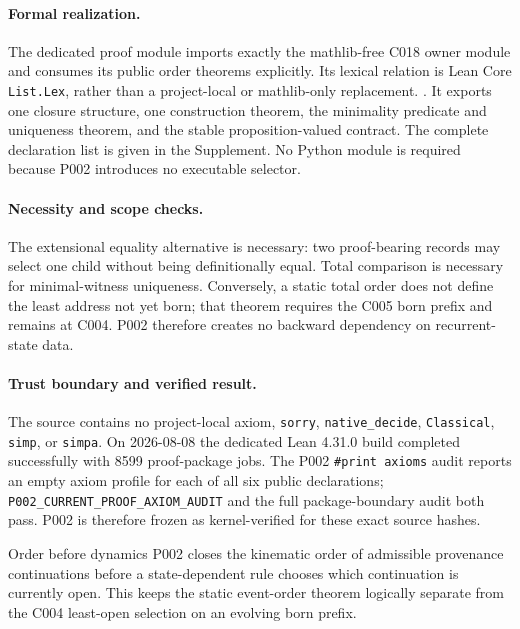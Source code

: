 \paragraph*{Formal realization.}
The dedicated proof module imports exactly the mathlib-free C018 owner module
and consumes its public order theorems explicitly.  Its lexical relation is
Lean Core \texttt{List.Lex}, rather than a project-local or mathlib-only replacement.
\cite[List.Lex and decidableLex in Init/Data/List/Basic.lean, Lean v4.31.0]{LeanListLex431}.
It exports one closure
structure, one construction theorem, the minimality predicate and uniqueness
theorem, and the stable proposition-valued contract.  The complete declaration
list is given in the Supplement.  No Python module is required because P002
introduces no executable selector.

\paragraph*{Necessity and scope checks.}
The extensional equality alternative is necessary: two proof-bearing records
may select one child without being definitionally equal.  Total comparison is
necessary for minimal-witness uniqueness.  Conversely, a static total order
does not define the least address not yet born; that theorem requires the C005
born prefix and remains at C004.  P002 therefore creates no backward dependency
on recurrent-state data.

\paragraph*{Trust boundary and verified result.}
The source contains no project-local axiom, \texttt{sorry},
\texttt{native\_decide}, \texttt{Classical}, \texttt{simp}, or
\texttt{simpa}.  On 2026-08-08 the dedicated Lean 4.31.0 build completed
successfully with 8599 proof-package jobs.  The P002 \texttt{\#print axioms}
audit reports an empty axiom profile for each of all six public declarations;
\texttt{P002\_CURRENT\_PROOF\_AXIOM\_AUDIT} and the full package-boundary
audit both pass.  P002 is therefore frozen as kernel-verified for these exact
source hashes.

\begin{cnnaInfoBox}{Order before dynamics}
P002 closes the kinematic order of admissible provenance continuations before a
state-dependent rule chooses which continuation is currently open.  This keeps
the static event-order theorem logically separate from the C004 least-open
selection on an evolving born prefix.
\end{cnnaInfoBox}

